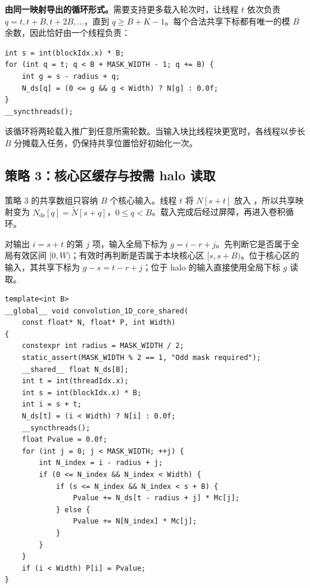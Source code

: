 \textbf{由同一映射导出的循环形式。}需要支持更多载入轮次时，让线程 $t$ 依次负责 $q=t,t+B,t+2B,\ldots$，直到 $q\ge B+K-1$。每个合法共享下标都有唯一的模 $B$ 余数，因此恰好由一个线程负责：
\par\noindent\begin{minipage}{\linewidth}
\begin{lstlisting}[caption={连续载入的索引推广；替换载入阶段，之后仍需相同屏障与计算循环。}]
int s = int(blockIdx.x) * B;
for (int q = t; q < B + MASK_WIDTH - 1; q += B) {
    int g = s - radius + q;
    N_ds[q] = (0 <= g && g < Width) ? N[g] : 0.0f;
}
__syncthreads();
\end{lstlisting}
\end{minipage}\par
该循环将两轮载入推广到任意所需轮数。当输入块比线程块更宽时，各线程以步长 $B$ 分摊载入任务，仍保持共享位置恰好初始化一次。

\subsection{策略 3：核心区缓存与按需 halo 读取}
策略 3 的共享数组只容纳 $B$ 个核心输入。线程 $t$ 将 $N[s+t]$ 放入 ，所以共享映射变为 $N_{\mathrm{ds}}[q]=\widetilde N[s+q]$，$0\le q<B$。载入完成后经过屏障，再进入卷积循环。

对输出 $i=s+t$ 的第 $j$ 项，输入全局下标为 $g=i-r+j$。先判断它是否属于全局有效区间 $[0,W)$；有效时再判断是否属于本块核心区 $[s,s+B)$。位于核心区的输入，其共享下标为 $g-s=t-r+j$；位于 halo 的输入直接使用全局下标 $g$ 读取。

\par\noindent\begin{minipage}{\linewidth}
\begin{lstlisting}[caption={策略 3：缓存核心区，并检查全局输入范围。},label={l8:lst:core}]
template<int B>
__global__ void convolution_1D_core_shared(
    const float* N, float* P, int Width)
{
    constexpr int radius = MASK_WIDTH / 2;
    static_assert(MASK_WIDTH % 2 == 1, "Odd mask required");
    __shared__ float N_ds[B];
    int t = int(threadIdx.x);
    int s = int(blockIdx.x) * B;
    int i = s + t;
    N_ds[t] = (i < Width) ? N[i] : 0.0f;
    __syncthreads();
    float Pvalue = 0.0f;
    for (int j = 0; j < MASK_WIDTH; ++j) {
        int N_index = i - radius + j;
        if (0 <= N_index && N_index < Width) {
            if (s <= N_index && N_index < s + B) {
                Pvalue += N_ds[t - radius + j] * Mc[j];
            } else {
                Pvalue += N[N_index] * Mc[j];
            }
        }
    }
    if (i < Width) P[i] = Pvalue;
}
\end{lstlisting}
\end{minipage}\par

